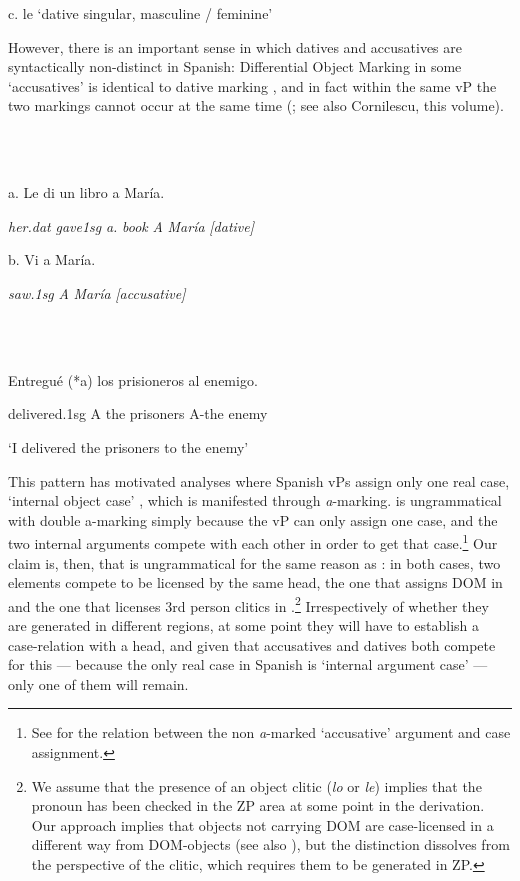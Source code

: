 \documentclass[output=paper,colorlinks,citecolor=brown]{./langscibook}
\begin{document}
  c. le ‘dative singular, masculine / feminine’

However, there is an important sense in which datives and accusatives are syntactically non-distinct in Spanish: Differential Object Marking in some ‘accusatives’ is identical to dative marking , and in fact within the same vP the two markings cannot occur at the same time  (\citealt{OrmazabalRomero2013Probus}; see also Cornilescu, this volume).

\ea%
    \label{ex:key:19}
    \gll\\
        \\
    \glt
    \z

          a.   Le     di     un libro a María.

    \textit{her.dat}   \textit{gave1sg}  \textit{a.}  \textit{book} \textit{A} \textit{María} \textit{[dative]}

  b.   Vi      a María.

    \textit{saw.1sg} \textit{A} \textit{María} \textit{[accusative]}

\ea%
    \label{ex:key:20}
    \gll\\
        \\
    \glt
    \z

         Entregué   (*a) los prisioneros   al     enemigo.

  delivered.1sg   A  the prisoners  A-the    enemy

  ‘I delivered the prisoners to the enemy’

This pattern has motivated analyses where Spanish vPs assign only one real case, ‘internal object case’ \citep{Romero2012, OrmazabalRomero2013Probus}, which is manifested through \textit{a}{}-marking.  is ungrammatical with double a-marking simply because the vP can only assign one case, and the two internal arguments compete with each other in order to get that case.\footnote{See \citet{Romero2012} for the relation between the non \textit{a}{}-marked ‘accusative’ argument and case assignment.}  Our claim is, then, that  is ungrammatical for the same reason as : in both cases, two elements compete to be licensed by the same head, the one that assigns DOM in  and the one that licenses 3rd person clitics in .\footnote{We assume that the presence of an object clitic (\textit{lo} or \textit{le}) implies that the pronoun has been checked in the ZP area at some point in the derivation. Our approach implies that objects not carrying DOM are case-licensed in a different way from DOM-objects (see also \citealt{López2012}), but the distinction dissolves from the perspective of the clitic, which requires them to be generated in ZP.} Irrespectively of whether they are generated in different regions, at some point they will have to establish a case-relation with a head, and given that accusatives and datives both compete for this — because the only real case in Spanish is ‘internal argument case’ — only one of them will remain.
\end{document}
